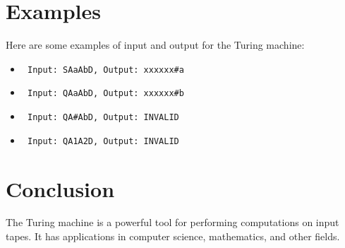 \documentclass{article}
\begin{document}
\section{Examples}
Here are some examples of input and output for the Turing machine:
\begin{itemize}
    \item \begin{verbatim} Input: SAaAbD, Output: xxxxxx#a \end{verbatim}
    \item \begin{verbatim} Input: QAaAbD, Output: xxxxxx#b \end{verbatim}
    \item \begin{verbatim} Input: QA#AbD, Output: INVALID \end{verbatim}
    \item \begin{verbatim} Input: QA1A2D, Output: INVALID \end{verbatim}
\end{itemize}

\section{Conclusion}
The Turing machine is a powerful tool for performing computations on input tapes. It has applications in computer science, mathematics, and other fields.
\end{document}
